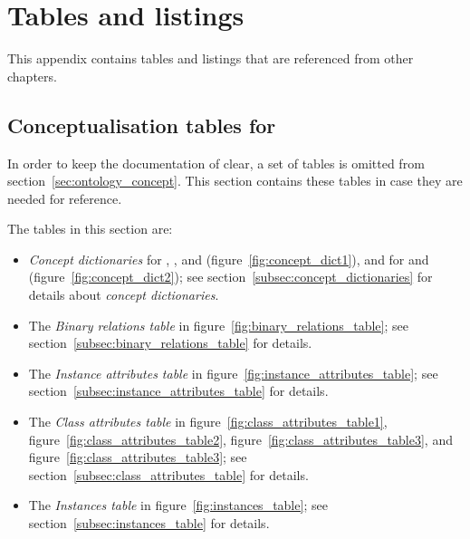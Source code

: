\chapter{Tables and listings}
\label{ch:listings}

This appendix contains tables and listings that are referenced from other chapters.

\section{Conceptualisation tables for \smarthomeweather}
\label{sec:appendix_conceptualisation}

In order to keep the documentation of \smarthomeweather clear, a set of tables is omitted from section~\ref{sec:ontology_concept}. This section contains these tables in case they are needed for reference.

The tables in this section are:

\begin{itemize}
  \item \emph{Concept dictionaries} for , , and  (figure~\ref{fig:concept_dict1}), and for  and  (figure~\ref{fig:concept_dict2}); see section~\ref{subsec:concept_dictionaries} for details about \emph{concept dictionaries}.
  
  \item The \emph{Binary relations table} in figure~\ref{fig:binary_relations_table}; see section~\ref{subsec:binary_relations_table} for details.
  
  \item The \emph{Instance attributes table} in figure~\ref{fig:instance_attributes_table}; see section~\ref{subsec:instance_attributes_table} for details.
  
  \item The \emph{Class attributes table} in figure~\ref{fig:class_attributes_table1}, figure~\ref{fig:class_attributes_table2}, figure~\ref{fig:class_attributes_table3}, and figure~\ref{fig:class_attributes_table3}; see section~\ref{subsec:class_attributes_table} for details.
  
  \item The \emph{Instances table} in figure~\ref{fig:instances_table}; see section~\ref{subsec:instances_table} for details.
\end{itemize}

